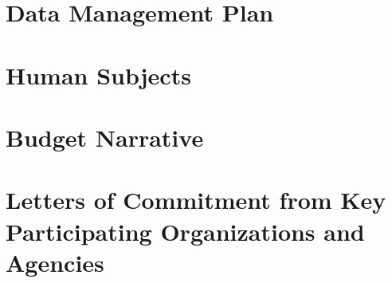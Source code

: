 \documentclass[12pt,letterpaper]{article}
\begin{document}
\renewcommand{\thepage}{}
\begin{appendices}
\section*{Data Management Plan}

\section*{Human Subjects}

\section*{Budget Narrative}
\label{budget}

\section*{Letters of Commitment from Key Participating Organizations and Agencies}

\end{appendices}

\pagebreak



\end{document}
